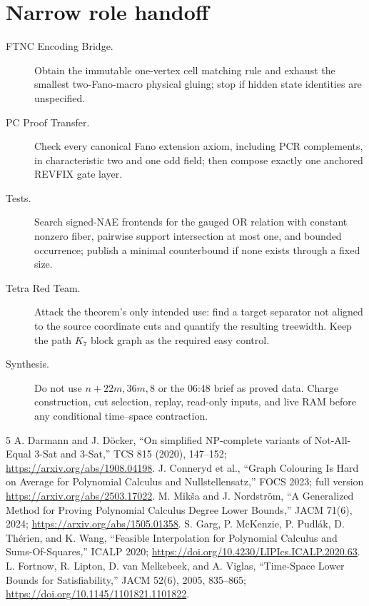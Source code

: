 \documentclass[11pt]{article}
\begin{document}
\section{Narrow role handoff}
\begin{description}
\item[FTNC Encoding Bridge.] Obtain the immutable one-vertex cell matching
rule and exhaust the smallest two-Fano-macro physical gluing; stop if hidden
state identities are unspecified.
\item[PC Proof Transfer.] Check every canonical Fano extension axiom, including
PCR complements, in characteristic two and one odd field; then compose exactly
one anchored REVFIX gate layer.
\item[Tests.] Search signed-NAE frontends for the gauged OR relation with
constant nonzero fiber, pairwise support intersection at most one, and bounded
occurrence; publish a minimal counterbound if none exists through a fixed size.
\item[Tetra Red Team.] Attack the theorem's only intended use: find a target
separator not aligned to the source coordinate cuts and quantify the resulting
treewidth.  Keep the path $K_7$ block graph as the required easy control.
\item[Synthesis.] Do not use $n+22m,36m,8$ or the 06:48 brief as proved data.
Charge construction, cut selection, replay, read-only inputs, and live RAM
before any conditional time--space contraction.
\end{description}

\small
\begin{thebibliography}{5}
 A. Darmann and J. D\"ocker, ``On simplified NP-complete variants
of Not-All-Equal 3-Sat and 3-Sat,'' TCS 815 (2020), 147--152;
\url{https://arxiv.org/abs/1908.04198}.
 J. Conneryd et al., ``Graph Colouring Is Hard on Average
for Polynomial Calculus and Nullstellensatz,'' FOCS 2023; full version
\url{https://arxiv.org/abs/2503.17022}.
 M. Mik\v{s}a and J. Nordstr\"om, ``A Generalized Method for
Proving Polynomial Calculus Degree Lower Bounds,'' JACM 71(6), 2024;
\url{https://arxiv.org/abs/1505.01358}.
 S. Garg, P. McKenzie, P. Pudl\'ak, D. Th\'erien, and K. Wang,
``Feasible Interpolation for Polynomial Calculus and Sums-Of-Squares,''
ICALP 2020; \url{https://doi.org/10.4230/LIPIcs.ICALP.2020.63}.
 L. Fortnow, R. Lipton, D. van Melkebeek, and A. Viglas,
``Time-Space Lower Bounds for Satisfiability,'' JACM 52(6), 2005, 835--865;
\url{https://doi.org/10.1145/1101821.1101822}.
\end{thebibliography}
\end{document}
